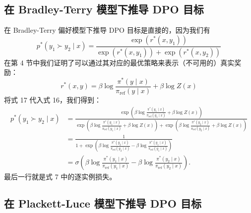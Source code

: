 \documentclass[11pt,UTF8,fontset=fandol]{ctexart}
\newcommand{\sref}{\mathrm{ref}}
\begin{document}
\subsection{在 Bradley-Terry 模型下推导 DPO 目标}

在 Bradley-Terry 偏好模型下推导 DPO 目标是直接的，因为我们有
\begin{equation}
p^*(y_1 \succ y_2 \mid x) = \frac{\exp\left(r^*(x, y_1)\right)}{\exp\left(r^*(x, y_1)\right) + \exp\left(r^*(x, y_2)\right)} \tag{16}
\end{equation}
在第 4 节中我们证明了可以通过其对应的最优策略来表示（不可用的）真实奖励：
\begin{equation}
r^*(x, y) = \beta \log \frac{\pi^*(y \mid x)}{\pi_\sref(y \mid x)} + \beta \log Z(x) \tag{17}
\end{equation}
将式 17 代入式 16，我们得到：
\[
\begin{aligned}
p^*(y_1 \succ y_2 \mid x) &= \frac{\exp\left(\beta \log \frac{\pi^*(y_1 \mid x)}{\pi_\sref(y_1 \mid x)} + \beta \log Z(x)\right)}{\exp\left(\beta \log \frac{\pi^*(y_1 \mid x)}{\pi_\sref(y_1 \mid x)} + \beta \log Z(x)\right) + \exp\left(\beta \log \frac{\pi^*(y_2 \mid x)}{\pi_\sref(y_2 \mid x)} + \beta \log Z(x)\right)} \\
&= \frac{1}{1 + \exp\left(\beta \log \frac{\pi^*(y_2 \mid x)}{\pi_\sref(y_2 \mid x)} - \beta \log \frac{\pi^*(y_1 \mid x)}{\pi_\sref(y_1 \mid x)}\right)} \\
&= \sigma\left(\beta \log \frac{\pi^*(y_1 \mid x)}{\pi_\sref(y_1 \mid x)} - \beta \log \frac{\pi^*(y_2 \mid x)}{\pi_\sref(y_2 \mid x)}\right).
\end{aligned}
\]
最后一行就是式 7 中的逐实例损失。

\subsection{在 Plackett-Luce 模型下推导 DPO 目标}
\end{document}
